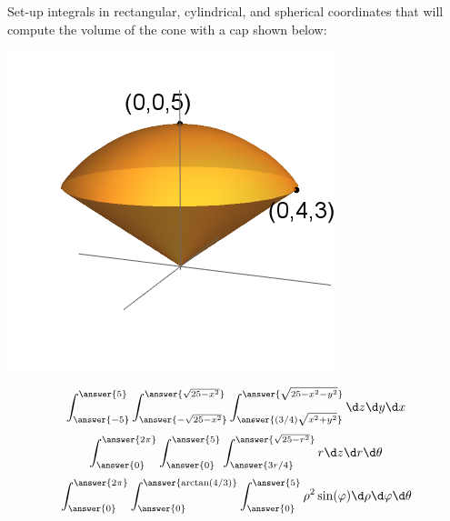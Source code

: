 \documentclass{ximera}
\author{Bart Snapp}
\begin{document}
\begin{exercise}
  Set-up integrals in rectangular, cylindrical, and spherical
  coordinates that will compute the volume of the cone with a cap shown below:
  \begin{image}
    \includegraphics{coneWithCap2.png}
  \end{image}
  \begin{prompt}
  \[
  \int_{\answer{-5}}^{\answer{5}}\int_{\answer{-\sqrt{25-x^2}}}^{\answer{\sqrt{25-x^2}}}\int_{\answer{(3/4)\sqrt{x^2+y^2}}}^{\answer{\sqrt{25-x^2-y^2}}}\d z \d y \d x
  \]
  \[
  \int_{\answer{0}}^{\answer{2\pi}}\int_{\answer{0}}^{\answer{5}}\int_{\answer{3r/4}}^{\answer{\sqrt{25-r^2}}}   r\d z \d r \d \theta
  \]
  \[
  \int_{\answer{0}}^{\answer{2\pi}}\int_{\answer{0}}^{\answer{\arctan(4/3)}}\int_{\answer{0}}^{\answer{5}}   \rho^2\sin(\varphi)\d \rho \d \varphi \d \theta
  \]
  \end{prompt}
\end{exercise}
\end{document}
